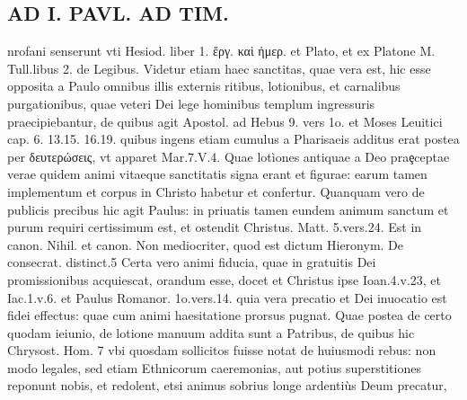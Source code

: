 \documentclass{article}
\begin{document}
\begin{pages}
\section*{AD I. PAVL. AD TIM. }
\marginpar{[ p.66 ]}\pstart nrofani senserunt vti Hesiod. liber 1. ἔργ. καὶ ἠμερ. et Plato, et ex Platone M. Tull.libus 2. de Legibus.  \pend\pstart Videtur etiam haec sanctitas, quae vera est, hic esse opposita a Paulo omnibus illis externis ritibus, lotionibus, et carnalibus purgationibus, quae veteri Dei lege hominibus templum ingressuris praecipiebantur, de quibus agit Apostol. ad Hebus  9. vers 1o. et Moses Leuitici cap. 6. 13.15. 16.19. quibus ingens etiam cumulus a Pharisaeis additus erat postea per δευτερώσεις, vt apparet Mar.7.V.4. Quae lotìones antiquae a Deo praȩceptae verae quidem animi vitaeque sanctitatis signa erant et figurae: earum tamen implementum et corpus in Christo habetur et confertur. Quanquam vero de publicis precibus hic agit Paulus: in priuatis tamen eundem animum sanctum et purum requiri certissimum est, et ostendit Christus. Matt. 5.vers.24. Est in canon. Nihil. et canon. Non mediocriter, quod est dictum Hieronym. De consecrat. distinct.5  \pend\pstart Certa vero animi fiducia, quae in gratuitis Dei promissionibus acquiescat, orandum esse, docet et Christus ipse Ioan.4.v.23, et Iac.1.v.6. et Paulus Romanor. 1o.vers.14. quia vera precatio et Dei inuocatio est fidei effectus: quae cum animi haesitatione prorsus pugnat.  \pend\pstart Quae postea de certo quodam ieiunio, de lotione manuum addita sunt a Patribus, de quibus hic Chrysost. Hom. 7 vbi quosdam sollicitos fuisse notat de huiusmodi rebus: non modo legales, sed etiam Ethnicorum caeremonias, aut potius superstitiones reponunt nobis, et redolent, etsi animus sobrius longe ardentiùs Deum precatur,  \pend

\end{pages}
\end{document}
